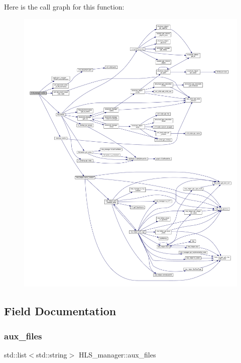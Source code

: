 Here is the call graph for this function\+:
\nopagebreak
\begin{figure}[H]
\begin{center}
\leavevmode
\includegraphics[width=350pt]{dc/dd7/classHLS__manager_adc098d176fadc4a0fb07eeb325022b6d_cgraph}
\end{center}
\end{figure}


\subsection{Field Documentation}
\mbox{\label{classHLS__manager_a98809821a94ac786b2564bc01451a357}} 
\subsubsection{\texorpdfstring{aux\+\_\+files}{aux\_files}}
{\footnotesize\ttfamily std\+::list$<$std\+::string$>$ H\+L\+S\+\_\+manager\+::aux\+\_\+files}



